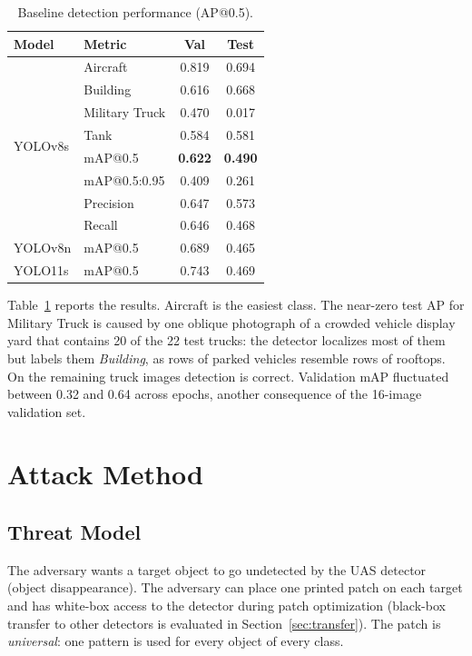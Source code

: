 \documentclass[conference]{IEEEtran}
\begin{document}
\begin{table}[t]
\centering
\caption{Baseline detection performance (AP@0.5).}
\label{tab:baseline}
\begin{tabular}{llcc}
\toprule
Model & Metric & Val & Test \\
\midrule
\multirow{8}{*}{YOLOv8s} & Aircraft & 0.819 & 0.694 \\
 & Building & 0.616 & 0.668 \\
 & Military Truck & 0.470 & 0.017 \\
 & Tank & 0.584 & 0.581 \\
\cmidrule{2-4}
 & mAP@0.5 & \textbf{0.622} & \textbf{0.490} \\
 & mAP@0.5:0.95 & 0.409 & 0.261 \\
 & Precision & 0.647 & 0.573 \\
 & Recall & 0.646 & 0.468 \\
\midrule
YOLOv8n & mAP@0.5 & 0.689 & 0.465 \\
YOLO11s & mAP@0.5 & 0.743 & 0.469 \\
\bottomrule
\end{tabular}
\end{table}

Table~\ref{tab:baseline} reports the results. Aircraft is the easiest class. The near-zero
test AP for Military Truck is caused by one oblique photograph of a crowded vehicle display
yard that contains 20 of the 22 test trucks: the detector localizes most of them but labels
them \emph{Building}, as rows of parked vehicles resemble rows of rooftops. On the remaining
truck images detection is correct. Validation mAP fluctuated between 0.32 and 0.64 across
epochs, another consequence of the 16-image validation set.

\section{Attack Method}
\label{sec:method}
\subsection{Threat Model}
The adversary wants a target object to go undetected by the UAS detector
(object disappearance). The adversary can place one printed patch on each target and has
white-box access to the detector during patch optimization (black-box transfer to other
detectors is evaluated in Section~\ref{sec:transfer}). The patch is \emph{universal}: one
pattern is used for every object of every class.
\end{document}
